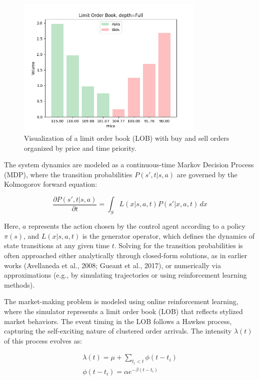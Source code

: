 \documentclass[11pt]{article}
\begin{document}
    \begin{figure}[htb]
        \centering
        \includegraphics[width=0.8\textwidth]{img/lob.png}
        \caption{Visualization of a limit order book (LOB) with buy and sell orders organized by price and time priority.}
        \label{fig:lob}
    \end{figure}

    The system dynamics are modeled as a continuous-time Markov Decision Process (MDP), where the transition probabilities
    \( P(s', t|s, a) \) are governed by the Kolmogorov forward equation:

    \[
        \frac{\partial P(s', t|s, a)}{\partial t} = \int_S L(x|s, a, t) P(s'|x, a, t) \, dx
    \]

    Here, \( a \) represents the action chosen by the control agent according to a policy \( \pi(s) \), and \( L(x|s, a, t) \) is the generator operator,
    which defines the dynamics of state transitions at any given time \( t \).
    Solving for the transition probabilities is often approached either analytically through closed-form solutions,
    as in earlier works (Avellaneda et al., 2008; Gueant et al., 2017),
    or numerically via approximations (e.g., by simulating trajectories or using reinforcement learning methods).

    The market-making problem is modeled using online reinforcement learning, where the simulator represents a
    limit order book (LOB) that reflects stylized market behaviors.
    The event timing in the LOB follows a Hawkes process, capturing the self-exciting nature of clustered order arrivals.
    The intensity \( \lambda(t) \) of this process evolves as:

    \begin{gather*}
        \lambda(t) = \mu + \sum_{t_i < t} \phi(t - t_i)\\
        \phi(t - t_i) = \alpha e^{-\beta(t - t_i)}\\
    \end{gather*}
\end{document}
